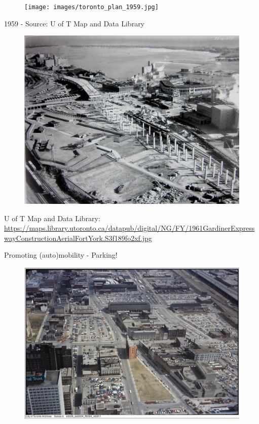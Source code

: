 \documentclass[aspectratio=169]{beamer}
\begin{document}
\begin{frame}
	
	\begin{figure}
		\centering
		\texttt{[image: images/toronto\_plan\_1959.jpg]}
		
	\end{figure}
	
	
	\tiny{1959 - Source: U of T Map and Data Library}
	
\end{frame}






\begin{frame}
	
	\begin{figure}
		\centering
		\includegraphics[width=0.7\linewidth]{images/gardiner_construction.jpg}
		
	\end{figure}
	\tiny{U of T Map and Data Library:  \url{https://maps.library.utoronto.ca/datapub/digital/NG/FY/1961GardinerExpresswayConstructionAerialFortYork.S3f189fo2xf.jpg}}
	
\end{frame}



\begin{frame}
	
	Promoting (auto)mobility - Parking!
	
	\begin{figure}
		\centering
		\includegraphics[width=0.7\linewidth]{images/tor_downtown_parking.png}
		
	\end{figure}
	
	
	
\end{frame}
\end{document}
